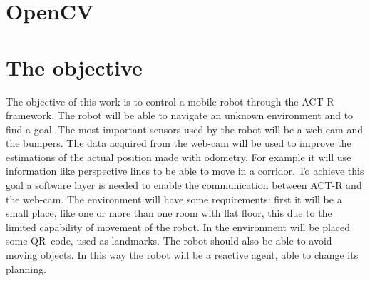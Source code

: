 \section{OpenCV}
\section{The objective}
The objective of this work is to control a mobile robot through the \mbox{ACT-R} framework. The robot will be able to navigate an unknown environment and to find a goal. The most important sensors used by the robot will be a \mbox{web-cam} and the bumpers. The data acquired from the \mbox{web-cam} will be used to improve the estimations of the actual position made with odometry. For example it will use information like perspective lines to be able to move in a corridor.
To achieve this goal a software layer is needed to enable the communication between ACT-R and the \mbox{web-cam}. The environment will have some requirements: first it will be a small place, like one or more than one room with flat floor, this due to the limited capability of movement of the robot. In the environment will be placed some \mbox{QR code}, used as landmarks.
The robot should also be able to avoid moving objects. In this way the robot will be a reactive agent, able to change its planning. 








